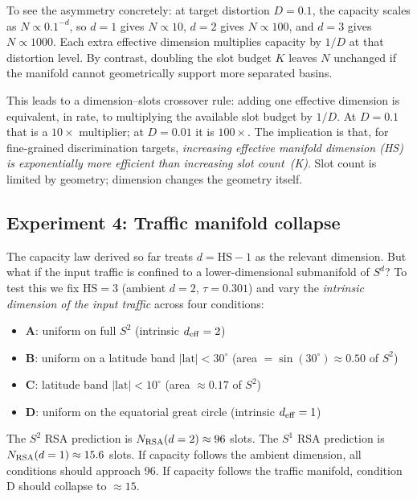 \documentclass[11pt]{article}
\begin{document}
To see the asymmetry concretely: at target distortion $D = 0.1$, the
capacity scales as $N \propto 0.1^{-d}$, so $d=1$ gives $N \propto 10$,
$d=2$ gives $N \propto 100$, and $d=3$ gives $N \propto 1000$.
Each extra effective dimension multiplies capacity by $1/D$ at that distortion
level.
By contrast, doubling the slot budget $K$ leaves $N$ unchanged if the
manifold cannot geometrically support more separated basins.

This leads to a dimension--slots crossover rule: adding one effective
dimension is equivalent, in rate, to multiplying the available slot budget by
$1/D$.
At $D=0.1$ that is a $10\times$ multiplier; at $D=0.01$ it is $100\times$.
The implication is that, for fine-grained discrimination targets,
\emph{increasing effective manifold dimension (HS) is exponentially more
efficient than increasing slot count~(K)}.
Slot count is limited by geometry; dimension changes the geometry itself.

\subsection{Experiment 4: Traffic manifold collapse}

The capacity law derived so far treats $d = \mathrm{HS} - 1$ as the relevant
dimension.
But what if the input traffic is confined to a lower-dimensional submanifold
of $S^d$?
To test this we fix $\mathrm{HS}=3$ (ambient $d=2$, $\tau=0.301$) and vary the
\emph{intrinsic dimension of the input traffic} across four conditions:

\begin{itemize}
  \item \textbf{A}: uniform on full $S^2$ (intrinsic $d_{\rm eff}=2$)
  \item \textbf{B}: uniform on a latitude band $|\text{lat}| < 30^\circ$
        (area $= \sin(30^\circ) \approx 0.50$ of $S^2$)
  \item \textbf{C}: latitude band $|\text{lat}| < 10^\circ$
        (area $\approx 0.17$ of $S^2$)
  \item \textbf{D}: uniform on the equatorial great circle (intrinsic $d_{\rm eff}=1$)
\end{itemize}

The $S^2$ RSA prediction is $N_{\rm RSA}(d=2) \approx 96$ slots.
The $S^1$ RSA prediction is $N_{\rm RSA}(d=1) \approx 15.6$ slots.
If capacity follows the ambient dimension, all conditions should approach 96.
If capacity follows the traffic manifold, condition D should collapse to $\approx 15$.
\end{document}
